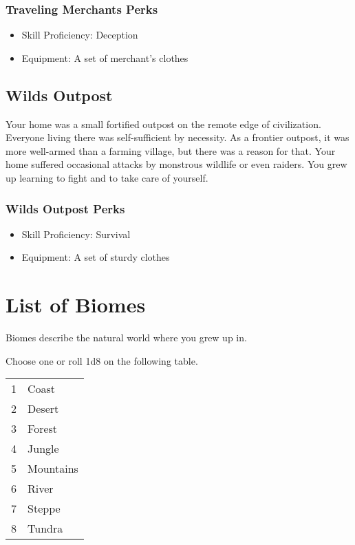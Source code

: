 \begin{multicols}{2}
\subsubsection{Traveling Merchants Perks}

\begin{itemize}
  \item Skill Proficiency: Deception
  \item Equipment: A set of merchant's clothes
\end{itemize}

\subsection{Wilds Outpost}

Your home was a small fortified outpost on the remote edge of civilization.
Everyone living there was self-sufficient by necessity. As a frontier
outpost, it was more well-armed than a farming village, but there was a
reason for that. Your home suffered occasional attacks by monstrous
wildlife or even raiders. You grew up learning to fight and to take
care of yourself.

\subsubsection{Wilds Outpost Perks}

\begin{itemize}
  \item Skill Proficiency: Survival
  \item Equipment: A set of sturdy clothes
\end{itemize}

\section{List of Biomes}

Biomes describe the natural world where you grew up in. 

Choose one or roll 1d8 on the following table.

\begin{center}
{
\begin{xtabular}{|l|l|}
1 & Coast \\
2 & Desert \\
3 & Forest \\
4 & Jungle \\
5 & Mountains \\
6 & River \\
7 & Steppe \\
8 & Tundra \\
\hline
\end{xtabular}
}
\end{center}


\end{multicols}
